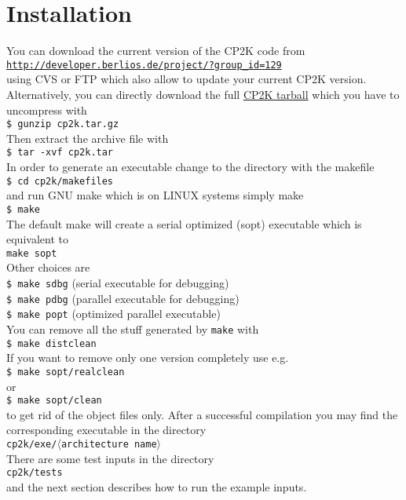 \documentclass[12pt,twoside,a4paper]{article}
\newcommand{\la}{$\langle$}
\newcommand{\ra}{$\rangle$}
\begin{document}
\section{Installation}
%
You can download the current version of the CP2K code from\\[2mm]
\href{http://developer.berlios.de/project/?group_id=129}
     {\tt http://developer.berlios.de/project/?group\_id=129}\\[2mm]
using CVS or FTP which also allow to update your current CP2K version.
Alternatively, you can directly download the full
\href{http://cvs.berlios.de/cgi-bin/viewcvs.cgi/cp2k/cp2k.tar.gz?tarball=1}
     {CP2K tarball} which you have to uncompress with\\[2mm]
{\tt \$ gunzip cp2k.tar.gz}\\[2mm]
Then extract the archive file with\\[2mm]
{\tt \$ tar -xvf cp2k.tar}\\[2mm]
In order to generate an executable change to the directory
with the makefile\\[2mm]
{\tt \$ cd cp2k/makefiles}\\[2mm]
and run GNU make which is on LINUX systems simply make\\[2mm]
{\tt \$ make}\\[2mm]
The default make will create a serial optimized (sopt) executable which
is equivalent to\\[2mm]
{\tt make sopt}\\[2mm]
Other choices are\\[2mm]
{\tt \$ make sdbg} (serial executable for debugging)\\[2mm]
{\tt \$ make pdbg} (parallel executable for debugging)\\[2mm]
{\tt \$ make popt} (optimized parallel executable)\\[2mm]
You can remove all the stuff generated by {\tt make} with\\[2mm]
{\tt \$ make distclean}\\[2mm]
If you want to remove only one version completely use e.g.\\[2mm]
{\tt \$ make sopt/realclean}\\[2mm]
or\\[2mm]
{\tt \$ make sopt/clean}\\[2mm]
to get rid of the object files only.
After a successful compilation you may find the corresponding executable
in the directory\\[2mm]
{\tt cp2k/exe/\la{\rm architecture name}\ra}\\[2mm]
There are some test inputs in the directory\\[2mm]
{\tt cp2k/tests}\\[2mm]
and the next section describes how to run the example inputs.
\newpage
%
\end{document}
